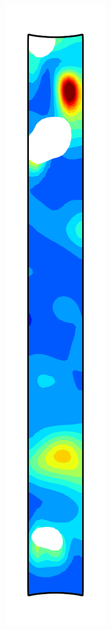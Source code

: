 \begin{figure}[!htb]
\begin{subfigure}{0.08\textwidth}
  \end{subfigure}
  \begin{subfigure}{0.08\textwidth}
    \centering
    \includegraphics[width=\textwidth]{Chapter5/figures/spallation/ep_3}

\end{subfigure}
\end{figure}

